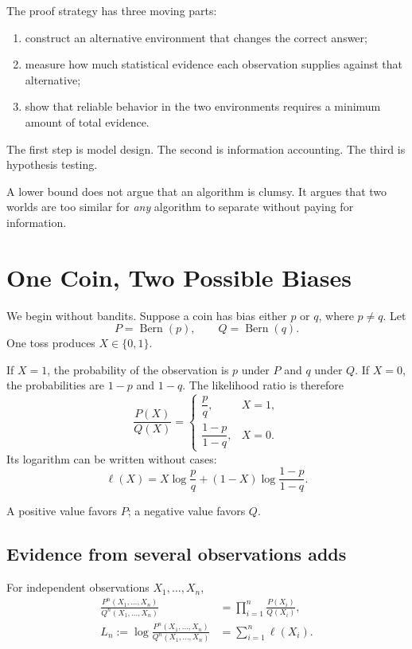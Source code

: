\documentclass[en,nofont,11pt]{elegantbook}
\newcommand{\Ber}{\operatorname{Bern}}
\begin{document}
The proof strategy has three moving parts:

\begin{enumerate}
\item construct an alternative environment that changes the correct answer;
\item measure how much statistical evidence each observation supplies against that alternative;
\item show that reliable behavior in the two environments requires a minimum amount of total evidence.
\end{enumerate}

The first step is model design. The second is information accounting. The third is hypothesis testing.

\begin{keyidea}
A lower bound does not argue that an algorithm is clumsy. It argues that two worlds are too similar for \emph{any} algorithm to separate without paying for information.
\end{keyidea}

\chapter{One Coin, Two Possible Biases}

We begin without bandits. Suppose a coin has bias either $p$ or $q$, where $p\neq q$. Let
\[
P=\Ber(p),
\qquad
Q=\Ber(q).
\]
One toss produces $X\in\{0,1\}$.

If $X=1$, the probability of the observation is $p$ under $P$ and $q$ under $Q$. If $X=0$, the probabilities are $1-p$ and $1-q$. The likelihood ratio is therefore
\[
\frac{P(X)}{Q(X)}
=
\begin{cases}
\dfrac{p}{q}, & X=1,\\[0.8em]
\dfrac{1-p}{1-q}, & X=0.
\end{cases}
\]
Its logarithm can be written without cases:
\begin{equation}
\ell(X)
=
X\log\frac{p}{q}
+(1-X)\log\frac{1-p}{1-q}.
\label{eq:one-step-llr}
\end{equation}

A positive value favors $P$; a negative value favors $Q$.

\section{Evidence from several observations adds}

For independent observations $X_1,\ldots,X_n$,
\begin{align*}
\frac{P^n(X_1,\ldots,X_n)}{Q^n(X_1,\ldots,X_n)}
&=
\prod_{i=1}^{n}\frac{P(X_i)}{Q(X_i)},\\
L_n
:=
\log\frac{P^n(X_1,\ldots,X_n)}{Q^n(X_1,\ldots,X_n)}
&=
\sum_{i=1}^{n}\ell(X_i).
\end{align*}
\end{document}
